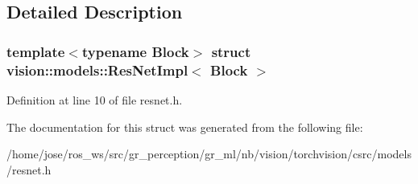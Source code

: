\subsection{Detailed Description}
\subsubsection*{template$<$typename Block$>$\newline
struct vision\+::models\+::\+Res\+Net\+Impl$<$ Block $>$}



Definition at line 10 of file resnet.\+h.



The documentation for this struct was generated from the following file\+:\begin{DoxyCompactItemize}
\item 
/home/jose/ros\+\_\+ws/src/gr\+\_\+perception/gr\+\_\+ml/nb/vision/torchvision/csrc/models/resnet.\+h\end{DoxyCompactItemize}
